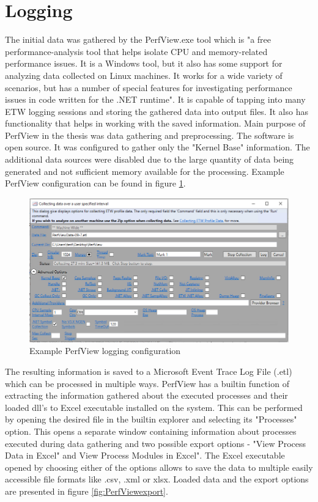 \documentclass[a4paper,twoside,12pt]{book}
\begin{document}
\section{Logging}

The initial data was gathered by the PerfView.exe tool which is "a free performance-analysis 
tool that helps isolate CPU and memory-related performance issues. It is a Windows tool, 
but it also has some support for analyzing data collected on Linux machines. It works for 
a wide variety of scenarios, but has a number of special features for investigating 
performance issues in code written for the .NET runtime"\cite{bib:PerfView}. It is capable of 
tapping into many ETW logging sessions and storing the gathered data into output files. It also 
has functionality that helps in working with the saved information. Main purpose of PerfView 
in the thesis was data gathering and preprocessing. The software is open source.
It was configured to gather only the "Kernel Base" information. The additional data sources 
were disabled due to the large quantity of data being generated and not sufficient memory 
available for the processing. Example PerfView configuration can be found in figure 
\ref{fig:PerfViewConfig}. 

\begin{figure}
	\centering
	\includegraphics[scale=0.55]{images/perf_config}
	\caption{Example PerfView logging configuration}
	\label{fig:PerfViewConfig}
 \end{figure}

The resulting information is saved to a Microsoft Event Trace Log File (.etl) which can be 
processed in multiple ways. PerfView has a builtin function of extracting the information 
gathered about the executed processes and their loaded dll's to Excel executable installed 
on the system. This can be performed by opening the desired file in the builtin explorer 
and selecting its "Processes" option. This opens a separate window containing information 
about processes executed during data gathering and two possible export options - 
"View Process Data in Excel" and View Process Modules in Excel". The Excel executable 
opened by choosing either of the options allows to save the data to multiple easily 
accessible file formats like .csv, .xml or xlsx. Loaded data and the export options are 
presented in figure \ref{fig:PerfViewexport}.
\end{document}
